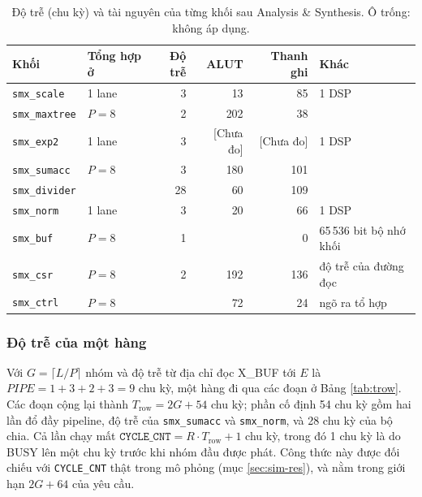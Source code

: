 \begin{table}[htbp]
\centering
\small
\begin{tabular}{llrrrl}
\toprule
Khối & Tổng hợp ở & Độ trễ & ALUT & Thanh ghi & Khác \\
\midrule
\texttt{smx\_scale}   & 1 lane  & 3  & 13  & 85  & 1 DSP \\
\texttt{smx\_maxtree} & $P = 8$ & 2  & 202 & 38  & \\
\texttt{smx\_exp2}    & 1 lane  & 3  & [Chưa đo] & [Chưa đo] & 1 DSP \\
\texttt{smx\_sumacc}  & $P = 8$ & 3  & 180 & 101 & \\
\texttt{smx\_divider} &         & 28 & 60  & 109 & \\
\texttt{smx\_norm}    & 1 lane  & 3  & 20  & 66  & 1 DSP \\
\texttt{smx\_buf}     & $P = 8$ & 1  &     & 0   & 65\,536 bit bộ nhớ khối \\
\texttt{smx\_csr}     & $P = 8$ & 2  & 192 & 136 & độ trễ của đường đọc \\
\texttt{smx\_ctrl}    & $P = 8$ &    & 72  & 24  & ngõ ra tổ hợp \\
\bottomrule
\end{tabular}
\caption{Độ trễ (chu kỳ) và tài nguyên của từng khối sau Analysis \& Synthesis. Ô trống: không áp dụng.}
\label{tab:blk-res}
\end{table}
\subsubsection{Độ trễ của một hàng}

Với $G = \lceil L/P \rceil$ nhóm và độ trễ từ địa chỉ đọc X\_BUF tới $E$ là $\mathit{PIPE} = 1 + 3 + 2 + 3 = 9$ chu kỳ, một hàng đi qua các đoạn ở Bảng \ref{tab:trow}. Các đoạn cộng lại thành $T_{\text{row}} = 2G + 54$ chu kỳ; phần cố định 54 chu kỳ gồm hai lần đổ đầy pipeline, độ trễ của \texttt{smx\_sumacc} và \texttt{smx\_norm}, và 28 chu kỳ của bộ chia. Cả lần chạy mất $\texttt{CYCLE\_CNT} = R \cdot T_{\text{row}} + 1$ chu kỳ, trong đó 1 chu kỳ là do BUSY lên một chu kỳ trước khi nhóm đầu được phát. Công thức này được đối chiếu với \texttt{CYCLE\_CNT} thật trong mô phỏng (mục \ref{sec:sim-res}), và nằm trong giới hạn $2G + 64$ của yêu cầu.

